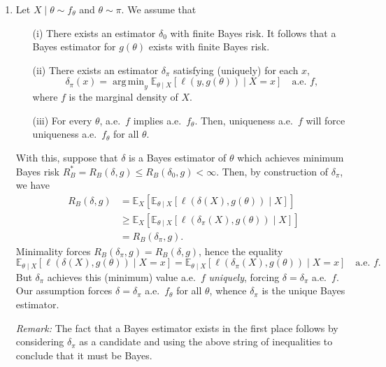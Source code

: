 \documentclass[11pt]{article}
\newcommand{\EE}{\mathbb{E}}
\DeclareMathOperator*{\argmin}{arg\,min}
\begin{document}
\begin{enumerate}
        \item Let $X\mid\theta \sim f_\theta$ and $\theta \sim \pi$.
        We assume that \begin{enumerate}
            \item[(i)] There exists an estimator $\delta_0$ with finite Bayes
            risk. It follows that a Bayes estimator for $g(\theta)$ exists with
            finite Bayes risk.
            \item[(ii)] There exists an estimator $\delta_\pi$ satisfying
            (uniquely) for each $x$, \[
                \delta_\pi(x) = \argmin_y \EE_{\theta\mid X}\left[\ell(y, g(\theta)) \mid X = x\right] \quad\text{a.e. } f,
            \] where $f$ is the marginal density of $X$.
            \item[(iii)] For every $\theta$, a.e.\ $f$ implies a.e.\
            $f_\theta$. Then, uniqueness a.e.\ $f$ will force uniqueness a.e.\
            $f_\theta$ for all $\theta$.
        \end{enumerate}

        With this, suppose that $\delta$ is a Bayes estimator of $\theta$ which
        achieves minimum Bayes risk $R_B^* = R_B(\delta, g) \leq R_B(\delta_0,
        g) < \infty$.
        Then, by construction of $\delta_\pi$, we have \begin{align*}
            R_B(\delta, g)
                &= \EE_X[\EE_{\theta\mid X}[\ell(\delta(X), g(\theta)) \mid X]] \\
                &\geq \EE_X[\EE_{\theta\mid X}[\ell(\delta_\pi(X), g(\theta)) \mid X]] \\
                &= R_B(\delta_\pi, g).
        \end{align*}
        Minimality forces $R_B(\delta_\pi, g) = R_B(\delta, g)$, hence the equality \[
            \EE_{\theta\mid X}[\ell(\delta(X), g(\theta)) \mid X = x]
                = \EE_{\theta\mid X}[\ell(\delta_\pi(X), g(\theta)) \mid X = x] \quad \text{a.e. }f.
        \] But $\delta_\pi$ achieves this (minimum) value a.e.\ $f$
        \emph{uniquely}, forcing $\delta = \delta_\pi$ a.e.\ $f$.
        Our assumption forces $\delta = \delta_\pi$ a.e.\ $f_\theta$ for all
        $\theta$, whence $\delta_\pi$ is the unique Bayes estimator.

        \emph{Remark:} The fact that a Bayes estimator exists in the first
        place follows by considering $\delta_\pi$ as a candidate and using the
        above string of inequalities to conclude that it must be Bayes.


    \end{enumerate}
\end{document}
